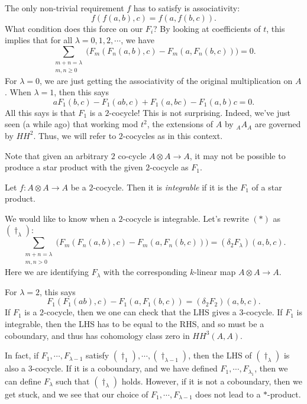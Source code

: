 \documentclass[a4paper]{article}
\newcommand\HH{H\!H}
\begin{document}
The only non-trivial requirement $f$ has to satisfy is associativity:
\[
  f(f(a, b), c) = f(a, f(b, c)).
\]
What condition does this force on our $F_i$? By looking at coefficients of $t$, this implies that for all $\lambda = 0, 1, 2, \cdots$, we have
\[
  \sum_{\substack{m + n = \lambda\\m, n \geq 0}} \Big(F_m(F_n(a, b), c) - F_m(a, F_n(b, c))\Big) = 0.\tag{$*$}
\]
For $\lambda = 0$, we are just getting the associativity of the original multiplication on $A$. When $\lambda = 1$, then this says
\[
  a F_1(b, c) - F_1(ab, c) + F_1(a, bc) - F_1(a, b)c = 0.
\]
All this says is that $F_1$ is a $2$-cocycle! This is not surprising. Indeed, we've just seen (a while ago) that working mod $t^2$, the extensions of $A$ by $_AA_A$ are governed by $\HH^2$. Thus, we will refer to $2$-cocycles as  in this context.

Note that given an arbitrary $2$ co-cycle $A \otimes A \to A$, it may not be possible to produce a star product with the given $2$-cocycle as $F_1$.
\begin{defi}
  Let $f: A \otimes A \to A$ be a $2$-cocycle. Then it is \emph{integrable} if it is the $F_1$ of a star product.
\end{defi}
We would like to know when a $2$-cocycle is integrable. Let's rewrite $(*)$ as $(\dagger_\lambda)$:
\[
  \sum_{\substack{m + n = \lambda\\m, n > 0}}\Big(F_m(F_n(a, b), c) - F_m(a, F_n(b, c))\Big) = (\delta_2 F_\lambda)(a, b, c).\tag{$\dagger_\lambda$}
\]
Here we are identifying $F_\lambda$ with the corresponding $k$-linear map $A \otimes A \to A$.

For $\lambda = 2$, this says
\[
  F_1(F_1(ab), c) - F_1(a, F_1(b, c)) = (\delta_2 F_2)(a, b, c).
\]
If $F_1$ is a $2$-cocycle, then we one can check that the LHS gives a $3$-cocycle. If $F_1$ is integrable, then the LHS has to be equal to the RHS, and so must be a coboundary, and thus has cohomology class zero in $\HH^3(A, A)$.

In fact, if $F_1, \cdots, F_{\lambda - 1}$ satisfy $(\dagger_1), \cdots, (\dagger_{\lambda - 1})$, then the LHS of $(\dagger_\lambda)$ is also a $3$-cocycle. If it is a coboundary, and we have defined $F_1, \cdots, F_{\lambda_1}$, then we can define $F_\lambda$ such that $(\dagger_\lambda)$ holds. However, if it is not a coboundary, then we get stuck, and we see that our choice of $F_1, \cdots, F_{\lambda - 1}$ does not lead to a $*$-product.
\end{document}
